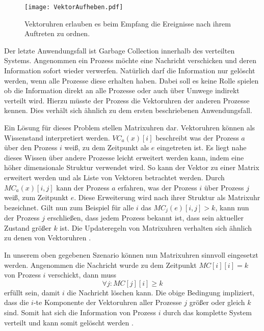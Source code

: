 \begin{figure}[ht]
    \centering
    \texttt{[image: VektorAufheben.pdf]}
    \caption[Aufheben alter Nachrichten]{Vektoruhren erlauben es beim Empfang die Ereignisse nach ihrem Auftreten zu ordnen.}
    \label{fig:vecaufheben}
\end{figure}

Der letzte Anwendungsfall ist Garbage Collection innerhalb des verteilten Systems.
Angenommen ein Prozess möchte eine Nachricht verschicken und deren Information sofort wieder verwerfen.
Natürlich darf die Information nur gelöscht werden, wenn alle Prozesse diese erhalten haben.
Dabei soll es keine Rolle spielen ob die Information direkt an alle Prozesse oder auch über Umwege indirekt verteilt wird.
Hierzu müsste der Prozess die Vektoruhren der anderen Prozesse kennen.
Dies verhält sich ähnlich zu dem ersten beschriebenen Anwendungsfall.

Ein Lösung für dieses Problem stellen Matrixuhren dar.
Vektoruhren können als Wissenstand interpretiert werden.
$VC_a(x)[i]$ beschreibt was der Prozess $a$ über den Prozess $i$ weiß, zu dem Zeitpunkt als $e$ eingetreten ist.
Es liegt nahe dieses Wissen über andere Prozesse leicht erweitert werden kann, indem eine höher dimensionale Struktur verwendet wird.
So kann der Vektor zu einer Matrix erweitert werden und als Liste von Vektoren betrachtet werden.
Durch $MC_a(x)[i,j]$ kann der Prozess $a$ erfahren, was der Prozess $i$ über Prozess $j$ weiß, zum Zeitpunkt $e$.
Diese Erweiterung wird nach ihrer Struktur als Matrixuhr bezeichnet.
Gilt nun zum Beispiel für alle $i$ das $MC_j(e)[i, j] > k$, kann nun der Prozess $j$ erschließen, dass jedem Prozess bekannt ist, dass sein aktueller Zustand größer $k$ ist.
Die Updateregeln von Matrixuhren verhalten sich ähnlich zu denen von Vektoruhren \cite{garg2005concurrent}.

In unserem oben gegebenen Szenario können nun Matrixuhren sinnvoll eingesetzt werden.
Angenommen die Nachricht wurde zu dem Zeitpunkt $MC[i][i]=k$ von Prozess $i$ verschickt, dann muss
\begin{equation*}
\forall j \colon MC[j][i] \geq k
\end{equation*}
erfüllt sein, damit $i$ die Nachricht löschen kann.
Die obige Bedingung impliziert, dass die $i$-te Komponente der Vektoruhren aller Prozesse $j$ größer oder gleich $k$ sind.
Somit hat sich die Information von Prozess $i$ durch das komplette System verteilt und kann somit gelöscht werden \cite{garg2005concurrent}.


